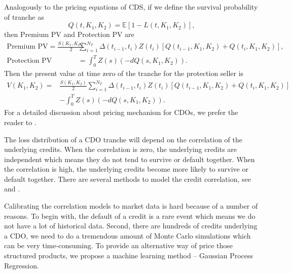 \documentclass[11pt,a4paper]{article}
\theoremstyle{definition}
\numberwithin{equation}{section}
\begin{document}
	Analogously to the pricing equations of CDS, if we define the survival probability of tranche as 
	\begin{equation}
	Q(t,K_1,K_2)=\mathbb E[1-L(t,K_1,K_2)],
	\end{equation}
	then Premium PV and Protection PV are 
	\begin{equation}
	\begin{split}
	\text{Premium PV} = \frac{S(K_1,K_2)}{2}&\sum_{i=1}^{N_T}\Delta(t_{i-1},t_i)Z(t_i)[Q(t_{i-1},K_1,K_2)+Q(t_{i},K_1,K_2)],\\
	\text{Protection PV} &=\int_{0}^{T}Z(s)(-dQ(s,K_1,K_2)).
	\end{split}
	\end{equation}
	Then the present value at time zero of the tranche 
	for the protection seller is
	\begin{equation}
	\begin{split}
	V(K_1,K_2) =& \frac{S(K_1,K_2)}{2}\sum_{i=1}^{N_T}\Delta(t_{i-1},t_i)Z(t_i)[Q(t_{i-1},K_1,K_2)+Q(t_{i},K_1,K_2)]\\
	&-\int_{0}^{T}Z(s)(-dQ(s,K_1,K_2)).
	\end{split}
	\end{equation}
	For a detailed discussion about pricing mechanism for CDOs, we prefer the reader to \cite[chapter 12]{okane}. 
	
	The loss distribution of a CDO tranche will depend on the correlation of the underlying credits. When the correlation is zero, the underlying credits are independent which means they do not tend to survive or default together. When the correlation is high, the underlying credits become more likely to survive or default together. There are several methods to model the credit correlation, see \cite{Elouerkhaoui} and \cite[Part II]{okane}.
	
	Calibrating the correlation models to market data is hard because of a number of reasons. To begin with, the default of a credit is a rare event which means we do not have a lot of historical data. Second, there are hundreds of credits underlying a CDO, we need to do a tremendous amount of Monte Carlo simulations which can be very time-consuming. To provide an alternative way of price those structured products, we propose a machine learning method -- Gaussian Process Regression.
	
\end{document}
